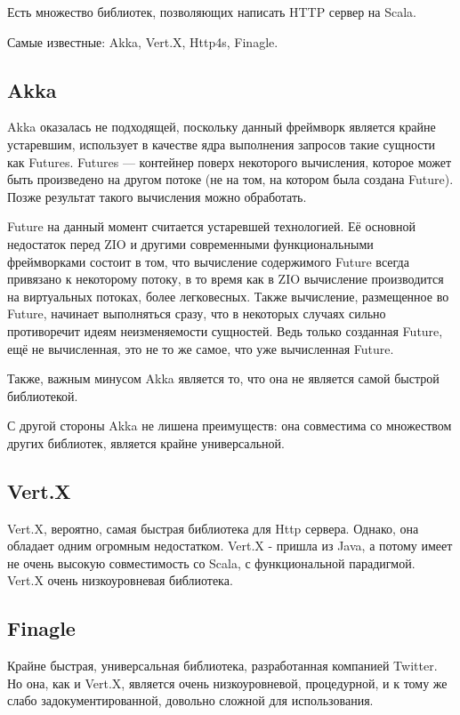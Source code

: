 \documentclass[14pt]{extarticle}
\begin{document}
    Есть множество библиотек, позволяющих написать HTTP сервер на Scala.

    Самые известные: Akka, Vert.X, Http4s, Finagle.


    \subsection{Akka}
    Akka оказалась не подходящей, поскольку данный фреймворк является крайне устаревшим, использует в качестве ядра выполнения
    запросов такие сущности как Futures. Futures --- контейнер поверх некоторого вычисления, которое может быть
    произведено на другом потоке (не на том, на котором была создана Future). Позже результат такого вычисления можно
    обработать.

    Future на данный момент считается устаревшей технологией. Её основной недостаток перед ZIO и другими
    современными функциональными фреймворками состоит в том, что
    вычисление содержимого Future всегда привязано к некоторому потоку, в то время как в ZIO вычисление производится
    на виртуальных потоках, более легковесных. Также вычисление, размещенное во Future, начинает выполняться сразу,
    что в некоторых случаях сильно противоречит идеям неизменяемости сущностей. Ведь только созданная Future, ещё не
    вычисленная, это не то же самое, что уже вычисленная Future.

    Также, важным минусом Akka является то, что она не является самой быстрой библиотекой.

    С другой стороны Akka не лишена преимуществ: она совместима со множеством других библиотек, является крайне
    универсальной.

    \subsection{Vert.X}
    Vert.X, вероятно, самая быстрая библиотека для Http сервера. Однако, она обладает одним огромным недостатком. 
    Vert.X - пришла из Java, а потому имеет не очень высокую совместимость со Scala, с функциональной парадигмой.
    Vert.X очень низкоуровневая библиотека.
    
    \subsection{Finagle}
    Крайне быстрая, универсальная библиотека, разработанная компанией Twitter. Но она, как и Vert.X, является очень
    низкоуровневой, процедурной, и к тому же слабо задокументированной, довольно сложной для использования.
    
\end{document}
